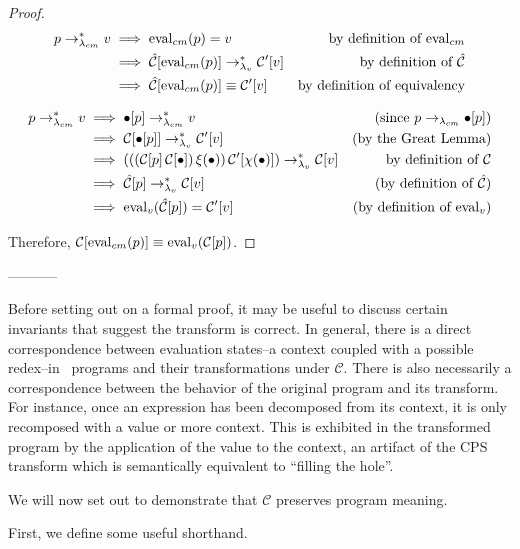 \begin{proof}

\begin{align*}
p\rightarrow_{\lambda_{cm}}^{*} v &\implies\mathrm{eval}_{cm}(p)=v &\text{by definition of $\mathrm{eval}_{cm}$}\\
          &\implies\hat{\mathcal{C}}[\mathrm{eval}_{cm}(p)]\rightarrow_{\lambda_v}^{*}\mathcal{C}'[v] &\text{by definition of $\hat{\mathcal{C}}$}\\
          &\implies\hat{\mathcal{C}}[\mathrm{eval}_{cm}(p)]\equiv\mathcal{C}'[v] &\text{by definition of equivalency}\\
\end{align*}

\begin{align*}
p\rightarrow_{\lambda_{cm}}^{*} v &\implies\bullet[p]\rightarrow_{\lambda_{cm}}^{*} v &\text{(since $p\rightarrow_{\lambda_{cm}}\bullet[p]$)}\\
          &\implies\mathcal{C}[\bullet[p]]\rightarrow_{\lambda_v}^{*}\mathcal{C}'[v] &\text{(by the Great Lemma)}\\
          &\implies(((\mathcal{C}[p]\,\mathcal{C}[\bullet])\,\xi(\bullet))\,\mathcal{C}'[\chi(\bullet)])\rightarrow_{\lambda_v}^{*}\mathcal{C}[v]&\text{by definition of $\mathcal{C}$}\\
          &\implies\hat{\mathcal{C}}[p]\rightarrow_{\lambda_v}^{*}\mathcal{C}[v]&\text{(by definition of $\hat{\mathcal{C}}$)}\\
          &\implies\mathrm{eval}_{v}(\hat{\mathcal{C}}[p])=\mathcal{C}'[v] &\text{(by definition of $\mathrm{eval}_v$)}
\end{align*}

Therefore, $\mathcal{C}[\mathrm{eval}_{cm}(p)]\equiv\mathrm{eval}_{v}(\mathcal{C}[p])$.
\end{proof}
-----------

Before setting out on a formal proof, it may be useful to discuss certain invariants that
suggest the transform is correct. In general, there is a direct correspondence between
evaluation states--a context coupled with a possible redex--in \cm\ programs and their
transformations under $\mathcal{C}$. There is also necessarily a correspondence between
the behavior of the original program and its transform. For instance, once an expression
has been decomposed from its context, it is only recomposed with a value or more context.
This is exhibited in the transformed program by the application of the value to the
context, an artifact of the CPS transform which is semantically equivalent to ``filling
the hole''.

We will now set out to demonstrate that $\mathcal{C}$ preserves program meaning.

First, we define some useful shorthand.



